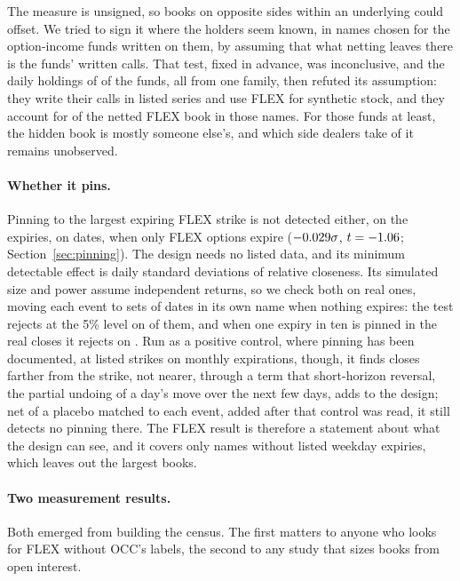 \documentclass[11pt]{article}
\begin{document}
The measure is unsigned, so books on opposite sides within an underlying could offset. We
tried to sign it where the holders seem known, in names chosen for the option-income funds
written on them, by assuming that what netting leaves there is the funds' written calls.
That test, fixed in advance, was inconclusive, and the daily holdings of \PBookFunds{} of
the funds, all from one family, then refuted its assumption: they write their calls in
listed series and use FLEX for synthetic stock, and they account for \PBookFundShare{} of
the netted FLEX book in those names. For those funds at least, the hidden book is mostly
someone else's, and which side dealers take of it remains unobserved.

\paragraph{Whether it pins.} Pinning to the largest expiring FLEX strike is not detected either, on the
\PinEvents{} expiries, on \PinDates{} dates, when only FLEX options expire
($-0.029\sigma$, $t=-1.06$; Section~\ref{sec:pinning}). The design needs no listed
data, and its minimum detectable effect is \PinMDE{} daily standard deviations of
relative closeness. Its simulated size and power assume independent returns, so we check
both on real ones, moving each event to \PinNullOffsets{} sets of dates in its own name
when nothing expires: the test rejects at the 5\% level on \PinNullSize{} of them, and
when one expiry in ten is pinned in the real closes it rejects on \PinNullPowerTen{}. Run
as a positive control, where pinning has been documented, at listed strikes on monthly
expirations, though, it finds closes farther from the strike, not nearer, through a term
that short-horizon reversal, the partial undoing of a day's move over the next few days,
adds to the design; net of a placebo matched to each event, added after that control was read,
it still detects no pinning there. The FLEX result is therefore a statement about what the
design can see, and it covers only names without listed weekday expiries, which leaves out
the largest books.

\paragraph{Two measurement results.} Both emerged from building the census. The first
matters to anyone who looks for FLEX without OCC's labels, the second to any study that
sizes books from open interest.
\end{document}
